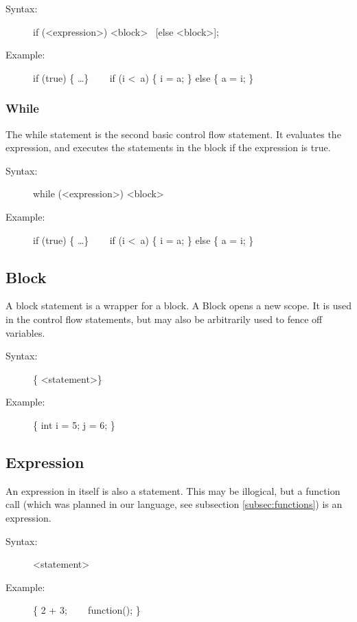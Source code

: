 \documentclass[10pt,a4paper]{report}
\begin{document}
\begin{description}
	\item[Syntax:] 
		if (\textless expression\textgreater ) \textless block\textgreater ~ [else \textless block\textgreater ];
	\item[Example:] 
		if (true) \{ \ldots \} ~~~
		if (i \textless ~a) \{ i = a; \} else \{ a = i; \}
\end{description} 


\subsubsection*{While}
The while statement is the second basic control flow statement. It evaluates the expression, and executes the statements in the block if the expression is true.

\begin{description}
	\item[Syntax:] 
		while (\textless expression\textgreater ) \textless block\textgreater
	\item[Example:] 
		if (true) \{ \ldots \} ~~~
		if (i \textless ~a) \{ i = a; \} else \{ a = i; \}
\end{description} 


\subsection{Block}
A block statement is a wrapper for a block. A Block opens a new scope. It is used in the control flow statements, but may also be arbitrarily used to fence off variables.

\begin{description}
	\item[Syntax:] 
		\{ \textless statement\textgreater * \}
	\item[Example:] 
		\{ int i = 5; j = 6; \}
\end{description} 

\subsection{Expression}
An expression in itself is also a statement. This may be illogical, but a function call (which was planned in our language, see subsection \ref{subsec:functions}) is an expression.

\begin{description}
	\item[Syntax:] 
		\textless statement\textgreater
	\item[Example:] 
		\{ 2 + 3; ~~~ function(); \}
\end{description} 
\end{document}
